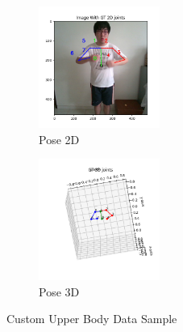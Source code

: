 \begin{figure}[ht]
    \begin{center}
        \begin{subfigure}[b]{0.35\textwidth}
            \includegraphics[width=150px]{assets/custom_pose_2d.png}
            \caption{Pose 2D}
            \label{fig:custom_pose_2d}
        \end{subfigure}
        \begin{subfigure}[b]{0.35\textwidth}
            \includegraphics[width=150px]{assets/custom_pose_3d.png}
            \caption{Pose 3D}
            \label{fig:custom_pose_3d}
        \end{subfigure}
	    \caption{Custom Upper Body Data Sample}
	    \label{fig:custom_sample_data}        
    \end{center}
\end{figure}
